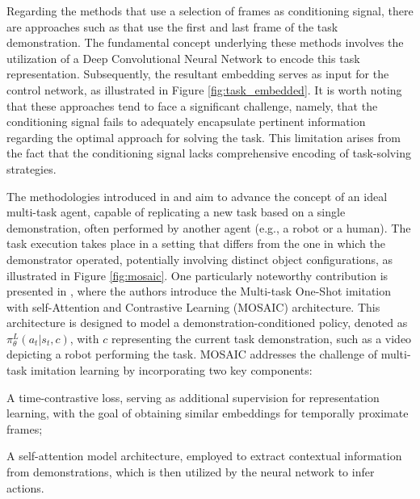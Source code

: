 \newline Regarding the methods that use a selection of frames as conditioning signal, there are approaches such as \cite{james2018task_embedded,bhutani2022attentive_one_shot} that use the first and last frame of the task demonstration. The fundamental concept underlying these methods involves the utilization of a Deep Convolutional Neural Network to encode this task representation. Subsequently, the resultant embedding serves as input for the control network, as illustrated in Figure \ref{fig:task_embedded}. It is worth noting that these approaches tend to face a significant challenge, namely, that the conditioning signal fails to adequately encapsulate pertinent information regarding the optimal approach for solving the task. This limitation arises from the fact that the conditioning signal lacks comprehensive encoding of task-solving strategies.

\newline The methodologies introduced in \cite{bhutani2022attentive_one_shot} and \cite{mandi2022towards_more_generalizable_one_shot} aim to advance the concept of an ideal multi-task agent, capable of replicating a new task based on a single demonstration, often performed by another agent (e.g., a robot or a human). The task execution takes place in a setting that differs from the one in which the demonstrator operated, potentially involving distinct object configurations, as illustrated in Figure \ref{fig:mosaic}. One particularly noteworthy contribution is presented in \cite{mandi2022towards_more_generalizable_one_shot}, where the authors introduce the Multi-task One-Shot imitation with self-Attention and Contrastive Learning (MOSAIC) architecture. This architecture is designed to model a demonstration-conditioned policy, denoted as $\pi^{L}_{\theta}(a_{t}|s_{t},c)$, with $c$ representing the current task demonstration, such as a video depicting a robot performing the task. MOSAIC addresses the challenge of multi-task imitation learning by incorporating two key components:
\begin{enumerate*}[label=\textbf{(\arabic*)}]
    \item A time-contrastive loss, serving as additional supervision for representation learning, with the goal of obtaining similar embeddings for temporally proximate frames;
    \item A self-attention model architecture, employed to extract contextual information from demonstrations, which is then utilized by the neural network to infer actions.
\end{enumerate*}
